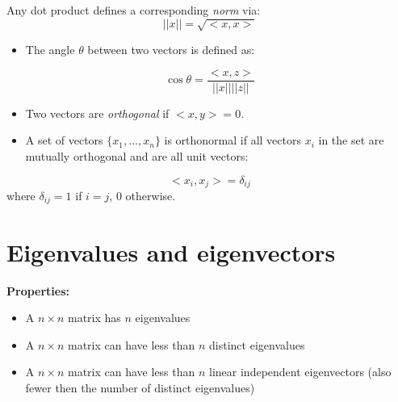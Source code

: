 Any dot product defines a corresponding \textit{norm} via:
\begin{equation*}
    ||x|| = \sqrt{<x,x>}
\end{equation*}

\begin{itemize}
    \item The angle $\theta$ between two vectors is defined as:
\end{itemize}
\begin{equation}
    \cos{\theta} = \frac{<x,z>}{||x||||z||}
\end{equation}

\begin{itemize}
    \item Two vectors are \textit{orthogonal} if $<x,y>=0$.
    
    \item A set of vectors $\{x_1,...,x_n\}$ is orthonormal if all vectors $x_i$ in the set are mutually orthogonal and are all unit vectors:
\end{itemize}
\begin{equation*}
    <x_i, x_j> = \delta_{ij}
\end{equation*}
\hspace{7mm} where $\delta_{ij}=1$ if $i=j$, $0$ otherwise.

\section{Eigenvalues and eigenvectors}
\label{sec:eigenvalues_eigenvectors}


\textbf{Properties:}
\begin{itemize}
    \item A $n \times n$ matrix has $n$ eigenvalues
    \item A $n \times n$ matrix can have less than $n$ distinct eigenvalues
    \item A $n \times n$ matrix can have less than $n$ linear independent eigenvectors (also fewer then the number of distinct eigenvalues)
\end{itemize}

